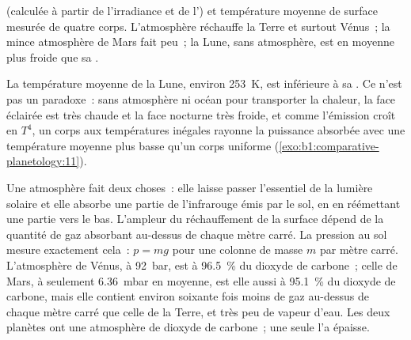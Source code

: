 \begin{omfigure}

{\small {} (calculée à partir de l'irradiance et de
l') et température moyenne de surface mesurée de quatre corps.
L'atmosphère réchauffe la Terre et surtout Vénus~; la mince atmosphère de Mars
fait peu~; la Lune, sans atmosphère, est en moyenne plus froide que sa
.}
\end{omfigure}

La température moyenne de la Lune, environ \qty{253}{K}, est inférieure à sa
. Ce n'est pas un paradoxe~: sans atmosphère ni océan
pour transporter la chaleur, la face éclairée est très chaude et la face
nocturne très froide, et comme l'émission croît en $T^4$, un corps aux
températures inégales rayonne la puissance absorbée avec une température
moyenne plus basse qu'un corps uniforme
(\cref{exo:b1:comparative-planetology:11}).

Une atmosphère fait deux choses~: elle laisse passer l'essentiel de la lumière
solaire et elle absorbe une partie de l'infrarouge émis par le sol, en en
réémettant une partie vers le bas. L'ampleur du réchauffement de la surface
dépend de la quantité de gaz absorbant au-dessus de chaque mètre carré. La
pression au sol mesure exactement cela~: $p = mg$ pour une colonne de masse $m$
par mètre carré. L'atmosphère de Vénus, à \qty{92}{bar}, est à
\qty{96.5}{\percent} du dioxyde de carbone~; celle de Mars, à seulement
\qty{6.36}{mbar} en moyenne, est elle aussi à \qty{95.1}{\percent} du dioxyde de
carbone, mais elle contient environ soixante fois moins de gaz au-dessus de
chaque mètre carré que celle de la Terre, et très peu de vapeur d'eau. Les deux
planètes ont une atmosphère de dioxyde de carbone~; une seule l'a épaisse.

